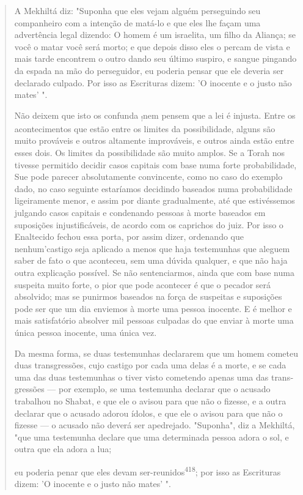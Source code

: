 \begin{quote}
A Mekhiltá diz: "Suponha que eles vejam alguém perseguindo seu
companheiro com a intenção de matá-lo e que eles lhe façam uma
advertência legal dizendo: O homem é um israelita, um filho da Aliança;
se você o matar você será morto; e que depois disso eles o percam de
vista e mais tarde encon­trem o outro dando seu último suspiro, e sangue
pingando da espada na mão do perseguidor, eu poderia pensar que ele
deveria ser declarado culpado. Por isso as Escrituras dizem: 'O inocente
e o justo não mates' ".

Não deixem que isto os confunda \textsubscript{!}nem pensem que a lei é
injusta. Entre os acontecimentos que estão entre os limites da
possibilidade, alguns são muito prováveis e outros altamente
improváveis, e outros ainda estão entre es­ses dois. Os limites da
possibilidade são muito amplos. Se a Torah nos tivesse permitido decidir
casos capitais com base numa forte probabilidade, Sue pode parecer
absolutamente convincente, como no caso do exemplo dado, no caso
seguinte estaríamos decidindo baseados numa probabilidade ligeiramente
me­nor, e assim por diante gradualmente, até que estivéssemos julgando
casos ca­pitais e condenando pessoas à morte baseados em suposições
injustificáveis, de acordo com os caprichos do juiz. Por isso o
Enaltecido fechou essa porta, por assim dizer, ordenando que
nenhum'castigo seja aplicado a menos que ha­ja testemunhas que aleguem
saber de fato o que aconteceu, sem uma dúvida qualquer, e que não haja
outra explicação possível. Se não sentenciarmos, ain­da que com base
numa suspeita muito forte, o pior que pode acontecer é que o pecador
será absolvido; mas se punirmos baseados na força de suspeitas e
suposições pode ser que um dia enviemos à morte uma pessoa inocente. E é
melhor e mais satisfatório absolver mil pessoas culpadas do que enviar à
morte uma única pessoa inocente, uma única vez.

Da mesma forma, se duas testemunhas declararem que um homem cometeu duas
transgressões, cujo castigo por cada uma delas é a morte, e se cada uma
das duas testemunhas o tiver visto cometendo apenas uma das
trans­gressões --- por exemplo, se uma testemunha declarar que o acusado
trabalhou no Shabat, e que ele o avisou para que não o fizesse, e a
outra declarar que o acusado adorou ídolos, e que ele o avisou para que
não o fizesse --- o acusado não deverá ser apedrejado. "Suponha", diz a
Mekhiltá, "que uma testemunha declare que uma determinada pessoa adora o
sol, e outra que ela adora a lua;

eu poderia penar que eles devam ser-reunidos\textsuperscript{418}; por
isso as Escrituras dizem: 'O inocente e o justo não mates' ".


\end{quote}
